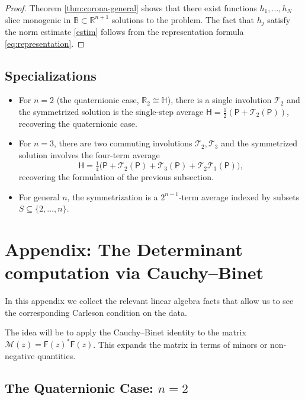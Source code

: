 \documentclass[11pt]{amsart}
\begin{document}
\begin{proof}
Theorem \ref{thm:corona-general} shows that there exist functions $h_1,\ldots, h_N$ slice monogenic in $\mathbb B\subset\mathbb{R}^{n+1}$ solutions to the problem. The fact that $h_j$ satisfy the norm estimate \eqref{estim} follows from the representation formula \eqref{eq:representation}. 
\end{proof}
\subsection{Specializations}

\begin{itemize}
\item For $n = 2$ (the quaternionic case, $\mathbb{R}_2 \cong \mathbb{H}$), there is a single involution $\mathcal T_2$ and the symmetrized solution is the single-step average $\mathsf{H} = \tfrac12(\mathsf{P} + \mathcal T_2(\mathsf{P}))$, recovering the quaternionic case.

\item For $n = 3$, there are two commuting involutions $\mathcal T_2, \mathcal T_3$ and the symmetrized solution involves the four-term average
\[
\mathsf{H} = \tfrac14\bigl(\mathsf{P} + \mathcal T_2(\mathsf{P}) + \mathcal T_3(\mathsf{P}) + \mathcal T_2 \mathcal T_3(\mathsf{P})\bigr),
\]
recovering the formulation of the previous subsection.

\item For general $n$, the symmetrization is a $2^{n-1}$-term average indexed by subsets $S \subseteq \{2, \ldots, n\}$.
\end{itemize}

\section{Appendix: The Determinant computation via Cauchy--Binet}
\label{s:LinearAlgebra}

In this appendix we collect the relevant linear algebra facts that allow us to see the corresponding Carleson condition on the data.

The idea will be to apply the Cauchy--Binet identity to the matrix $\mathcal{M}(z)=\mathsf{F}(z)^\ast \mathsf{F}(z)$.  This expands the matrix in terms of minors or non-negative quantities.

\subsection{\texorpdfstring{The Quaternionic Case: $n=2$}{The Quaternionic Case: n=2}}
\end{document}

